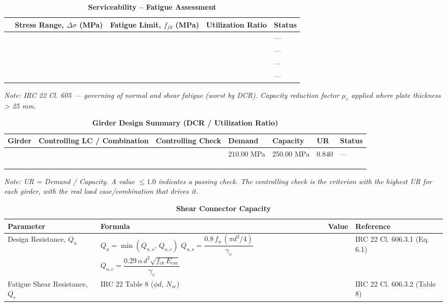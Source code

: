 \documentclass[12pt,a4paper]{report}
\numberwithin{table}{chapter}
\numberwithin{figure}{chapter}
\begin{document}
\vspace{1em}
\begin{longtable}{|C{2.5cm}|C{3.5cm}|C{3.5cm}|>{\centering\arraybackslash}p{3.5cm}|C{2.5cm}|}
\caption{\textbf{Serviceability -- Fatigue Assessment}}
\hline
\textbf{} & \textbf{Stress Range, $\Delta\sigma$ (MPa)} & \textbf{Fatigue Limit, $f_{fd}$ (MPa)} & \textbf{Utilization Ratio} & \textbf{Status} \\[6pt]
\hline
\makecell{} &  &  &  & --- \\[6pt]
\hline
\makecell{} &  &  &  & --- \\[6pt]
\hline
\makecell{} &  &  &  & --- \\[6pt]
\hline
\makecell{} &  &  &  & --- \\[6pt]
\hline
\end{longtable}
\noindent\textit{Note: IRC 22 Cl. 605 --- governing of normal and shear fatigue (worst by DCR). Capacity reduction factor $\mu_r$ applied where plate thickness > 25 mm.}

\vspace{1em}
\vspace{0.4em}
\begin{longtable}{|C{1.6cm}|>{\centering\arraybackslash}p{3.6cm}|C{2.4cm}|C{2.0cm}|C{2.1cm}|C{1.7cm}|C{1.5cm}|}
\caption{\textbf{Girder Design Summary (DCR / Utilization Ratio)}}
\hline
\textbf{Girder} & \textbf{Controlling LC / Combination} & \textbf{Controlling Check} & \textbf{Demand} & \textbf{Capacity} & \textbf{UR} & \textbf{Status} \\[6pt]
\hline
 &  &  & 210.00 MPa & 250.00 MPa & 0.840 & --- \\[6pt]
\hline
 &  &  &  &  &  &  \\[6pt]
\hline
 &  &  &  &  &  &  \\[6pt]
\hline
 &  &  &  &  &  &  \\[6pt]
\hline
\end{longtable}
\noindent\textit{Note: UR = Demand / Capacity. A value $\leq 1.0$ indicates a passing check. The controlling check is the criterion with the highest UR for each girder, with the real load case/combination that drives it.}

\vspace{1em}

\begin{longtable}{|L{3.6cm}|C{5.6cm}|>{\centering\arraybackslash}p{2.6cm}|L{3.0cm}|}
\caption{\textbf{Shear Connector Capacity}}
\hline
\textbf{Parameter} & \textbf{Formula} & \textbf{Value} & \textbf{Reference} \\[6pt]
\hline
Design Resistance, $Q_u$ & \footnotesize{} &  & IRC 22 Cl. 606.3.1 (Eq. 6.1) \\[6pt]
\hline
Fatigue Shear Resistance, $Q_r$ & IRC 22 Table 8 ($\phi d$, $N_{sc}$) &  & IRC 22 Cl. 606.3.2 (Table 8) \\[6pt]
\hline
\end{longtable}
\end{document}
